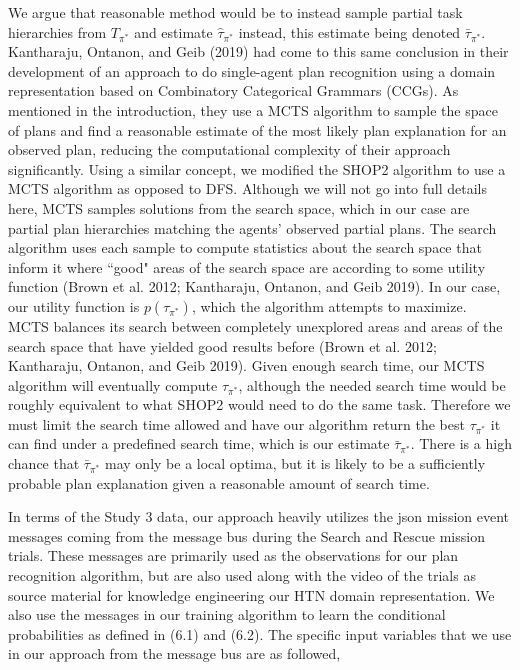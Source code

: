 We argue that reasonable method would be to instead sample partial task hierarchies from $T_{\pi^*}$ and estimate $\hat{\tau}_{\pi^*}$ instead, this estimate being denoted $\bar{\tau}_{\pi^*}$. Kantharaju, Ontanon, and Geib (2019) had come to this same conclusion in their development of an approach to do single-agent plan recognition using a domain representation based on Combinatory Categorical Grammars (CCGs). As mentioned in the introduction, they use a MCTS algorithm to sample the space of plans and find a reasonable estimate of the most likely plan explanation for an observed plan, reducing the computational complexity of their approach significantly. Using a similar concept, we modified the SHOP2 algorithm to use a MCTS algorithm as opposed to DFS. Although we will not go into full details here, MCTS samples solutions from the search space, which in our case are partial plan hierarchies matching the agents' observed partial plans. The search algorithm uses each sample to compute statistics about the search space that inform it where ``good" areas of the search space are according to some utility function (Brown et al. 2012; Kantharaju, Ontanon, and Geib 2019). In our case, our utility function is $p(\tau_{\pi^*})$, which the algorithm attempts to maximize. MCTS balances its search between completely unexplored areas and areas of the search space that have yielded good results before (Brown et al. 2012; Kantharaju, Ontanon, and Geib 2019). Given enough search time, our MCTS algorithm will eventually compute $\hat{\tau}_{\pi^*}$, although the needed search time would be roughly equivalent to what SHOP2 would need to do the same task. Therefore we must limit the search time allowed and have our algorithm return the best $\tau_{\pi^*}$ it can find under a predefined search time, which is our estimate $\bar{\tau}_{\pi^*}$. There is a high chance that $\bar{\tau}_{\pi^*}$ may only be a local optima, but it is likely to be a sufficiently probable plan explanation given a reasonable amount of search time. 

In terms of the Study 3 data, our approach heavily utilizes the json mission event messages coming from the message bus during the Search and Rescue mission trials. These messages are primarily used as the observations for our plan recognition algorithm, but are also used along with the video of the trials as source material for knowledge engineering our HTN domain representation. We also use the messages in our training algorithm to learn the conditional probabilities as defined in (6.1) and (6.2). The specific input variables that we use in our approach from the message bus are as followed, 


